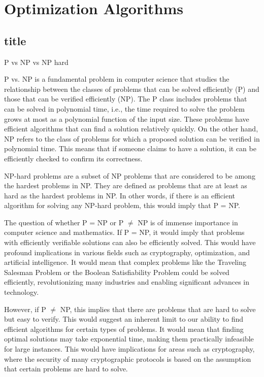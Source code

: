 \section{Optimization Algorithms}%

\subsection{title}
P vs NP vs NP hard

P vs. NP is a fundamental problem in computer science that studies the relationship between the classes of problems that can be solved efficiently (P) and those that can be verified efficiently (NP). The P class includes problems that can be solved in polynomial time, i.e., the time required to solve the problem grows at most as a polynomial function of the input size. These problems have efficient algorithms that can find a solution relatively quickly. On the other hand, NP refers to the class of problems for which a proposed solution can be verified in polynomial time. This means that if someone claims to have a solution, it can be efficiently checked to confirm its correctness.

NP-hard problems are a subset of NP problems that are considered to be among the hardest problems in NP. They are defined as problems that are at least as hard as the hardest problems in NP. In other words, if there is an efficient algorithm for solving any NP-hard problem, this would imply that P = NP.

The question of whether P = NP or P $\neq$ NP is of immense importance in computer science and mathematics. If P = NP, it would imply that problems with efficiently verifiable solutions can also be efficiently solved. This would have profound implications in various fields such as cryptography, optimization, and artificial intelligence. It would mean that complex problems like the Traveling Salesman Problem or the Boolean Satisfiability Problem could be solved efficiently, revolutionizing many industries and enabling significant advances in technology.

However, if P $\neq$ NP, this implies that there are problems that are hard to solve but easy to verify. This would suggest an inherent limit to our ability to find efficient algorithms for certain types of problems. It would mean that finding optimal solutions may take exponential time, making them practically infeasible for large instances. This would have implications for areas such as cryptography, where the security of many cryptographic protocols is based on the assumption that certain problems are hard to solve.

